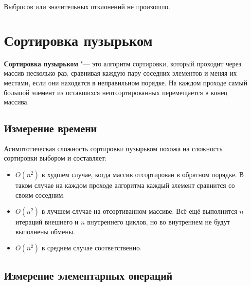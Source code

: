 \documentclass[11pt]{article}
\begin{document}
Выбросов или значительных отклонений не произошло.

\newpage

\setcounter{section}{2}
\section*{\centering Сортировка пузырьком}

\textbf{Сортировка пузырьком} "--- это алгоритм сортировки, который проходит через
массив несколько раз, сравнивая каждую пару соседних элементов и меняя их местами,
если они находятся в неправильном порядке. На каждом проходе самый большой элемент
из оставшихся неотсортированных перемещается в конец массива.

\setcounter{subsection}{0}
\subsection{Измерение времени}

\begin{center}
\end{center}
{ \hspace*{\fill} }

\begin{center}
\end{center}
{ \hspace*{\fill} }

Асимптотическая сложность сортировки пузырьком похожа на сложность сортировки выбором и составляет:
\begin{itemize}
    \item $O(n^2)$ в худшем случае, когда массив отсортирован в обратном порядке. В таком случае на
          каждом проходе алгоритма каждый элемент сравнится со своим соседним.
    \item $O(n^2)$ в лучшем случае на отсортиванном массиве. Всё ещё выполнится $n$ итераций
          внешнего и $n$ внутреннего циклов, но во внутреннем не будут выполнены обмены.
    \item $O(n^2)$ в среднем случае соответственно.
\end{itemize}

\subsection{Измерение элементарных операций}
\end{document}
